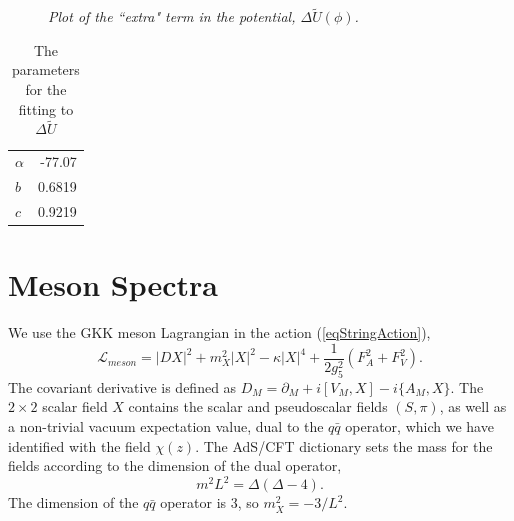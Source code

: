 \documentclass[12pt]{article}
\newcommand{\be}{\begin{equation}}
\newcommand{\ee}{\end{equation}}
\newcommand{\cL}{\mathcal L}
\begin{document}
\begin{figure}[htb]
\caption{\textit{Plot of the ``extra" term in the potential, $\Delta \tilde{U}(\phi)$.}}
\label{figdeltaU}
\end{figure}

\begin{table}[htb]
\begin{center}
\label{tabFit}
\begin{tabular}{| l | r | }
\hline
$\alpha$ & -77.07  \\ %
$b$ & 0.6819 \\ %
$c$ & 0.9219 \\ %
  \hline
\end{tabular}
\caption{The parameters for the fitting to $\Delta \tilde{U}$}
\end{center}
\end{table}

\section{Meson Spectra}

We use the GKK meson Lagrangian in the action (\ref{eqStringAction}),
\be
\cL_{meson}=\left|DX\right|^2+m_X^2\left|X\right|^2-\kappa\left|X\right|^4 +\frac{1}{2g_5^2}\left(F_A^2 +F_V^2\right).
\label{eqMesonL}
\ee
The covariant derivative is defined as $D_M = \partial_M+i[V_M,X]-i\{A_M,X\}$. The $2 \times 2$ scalar  field $X$ contains the scalar and pseudoscalar fields $(S,\pi)$, as well as a non-trivial vacuum expectation value, dual to the $q\bar{q}$ operator, which we have identified with the field $\chi(z)$.
The AdS/CFT dictionary sets the mass for the fields according to the dimension of the dual operator,
\be
m^2L^2=\Delta(\Delta-4).
\ee
The dimension of the $q\bar{q}$ operator is 3, so $m_X^2 = -3/L^2$.
\end{document}
